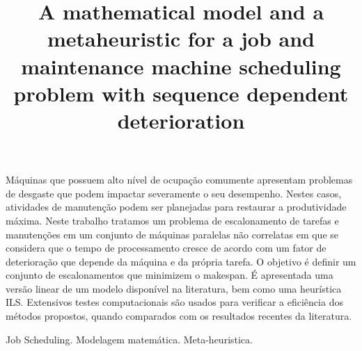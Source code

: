\documentclass[a4paper,11pt]{article}
\begin{document}
\title{A mathematical model and a metaheuristic for a job and maintenance machine scheduling problem with sequence dependent deterioration} 

\maketitle
\thispagestyle{fancy}

\author{
}

\author{ 
}

\vspace{8mm}
\begin{resumo}
M\'aquinas que possuem alto n\'ivel de ocupa\c c\~ao comumente apresentam problemas de desgaste que podem impactar severamente o seu desempenho. Nestes casos, atividades de manuten\c c\~ao podem ser planejadas para restaurar a produtividade m\'axima. Neste trabalho tratamos um problema de escalonamento de tarefas e manuten\c c\~oes em um conjunto de m\'aquinas paralelas n\~ao correlatas em que se considera que o tempo de processamento cresce de acordo com um fator de deteriora\c c\~ao que depende da m\'aquina e da pr\'opria tarefa. O objetivo \'e definir um conjunto de escalonamentos que minimizem o makespan. \'E apresentada uma vers\~ao linear de um modelo dispon\'ivel na literatura, bem como uma heur\'istica ILS. Extensivos testes computacionais s\~ao usados para verificar a efici\^encia dos m\'etodos propostos, quando comparados com os resultados recentes da literatura. 
 \end{resumo}

\bigskip
\begin{palchaves}
Job Scheduling. Modelagem matem\'atica. Meta-heuristica.

\bigskip
{}
\end{palchaves}


\vspace{8mm}
\end{document}
